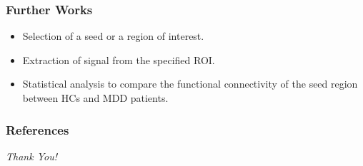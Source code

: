 \documentclass{beamer}
\begin{document}
  \begin{frame}[t]
    \frametitle{Further Works}

    \vskip 30pt

    \begin{itemize}

      \item Selection of a seed or a region of interest. \vskip 15pt
      \item Extraction of signal from the specified ROI. \vskip 15pt
      \item Statistical analysis to compare the functional
        connectivity of the seed region between HCs and MDD patients.
    \end{itemize}

  \end{frame}

  \begin{frame}
    \frametitle{References}
    \vskip -40pt
    \nocite{dataset}
    \nocite{fmripreprocessingsteps}

    \printbibliography

  \end{frame}

  \endgroup


  \begin{frame}[noframenumbering]
    \vspace{10pt}
    \begin{center}
      \Huge \emph{Thank You!}
    \end{center}
  \end{frame}
\end{document}
